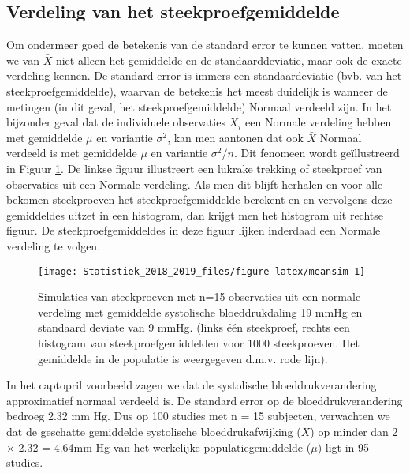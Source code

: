 \documentclass[12pt,dutch,coursenotes]{book}
\theoremstyle{definition}
\theoremstyle{definition}
\theoremstyle{definition}
\theoremstyle{remark}
\begin{document}
\subsection{Verdeling van het
steekproefgemiddelde}\label{subsec:verdelingXbar}

Om ondermeer goed de betekenis van de standard error te kunnen vatten,
moeten we van \(\bar X\) niet alleen het gemiddelde en de
standaarddeviatie, maar ook de exacte verdeling kennen. De standard
error is immers een standaardeviatie (bvb. van het
steekproefgemiddelde), waarvan de betekenis het meest duidelijk is
wanneer de metingen (in dit geval, het steekproefgemiddelde) Normaal
verdeeld zijn. In het bijzonder geval dat de individuele observaties
\(X_i\) een Normale verdeling hebben met gemiddelde \(\mu\) en variantie
\(\sigma^2\), kan men aantonen dat ook \(\bar X\) Normaal verdeeld is
met gemiddelde \(\mu\) en variantie \(\sigma^2/n.\) Dit fenomeen wordt
geïllustreerd in Figuur \ref{fig:meansim}. De linkse figuur illustreert
een lukrake trekking of steekproef van observaties uit een Normale
verdeling. Als men dit blijft herhalen en voor alle bekomen steekproeven
het steekproefgemiddelde berekent en en vervolgens deze gemiddeldes
uitzet in een histogram, dan krijgt men het histogram uit rechtse
figuur. De steekproefgemiddeldes in deze figuur lijken inderdaad een
Normale verdeling te volgen.

\begin{figure}

{\centering \texttt{[image: Statistiek\_2018\_2019\_files/figure-latex/meansim-1]} 

}

\caption{Simulaties van steekproeven met n=15 observaties uit een normale verdeling met gemiddelde systolische bloeddrukdaling 19 mmHg en standaard deviate van 9 mmHg. (links één steekproef, rechts een histogram van steekproefgemiddelden voor 1000 steekproeven. Het gemiddelde in de populatie is weergegeven d.m.v. rode lijn).}\label{fig:meansim}
\end{figure}

In het captopril voorbeeld zagen we dat de systolische
bloeddrukverandering approximatief normaal verdeeld is. De standard
error op de bloeddrukverandering bedroeg 2.32 mm Hg. Dus op 100 studies
met n = 15 subjecten, verwachten we dat de geschatte gemiddelde
systolische bloeddrukafwijking (\(\bar X\)) op minder dan 2 × 2.32 =
4.64mm Hg van het werkelijke populatiegemiddelde (\(\mu\)) ligt in 95
studies.
\end{document}
